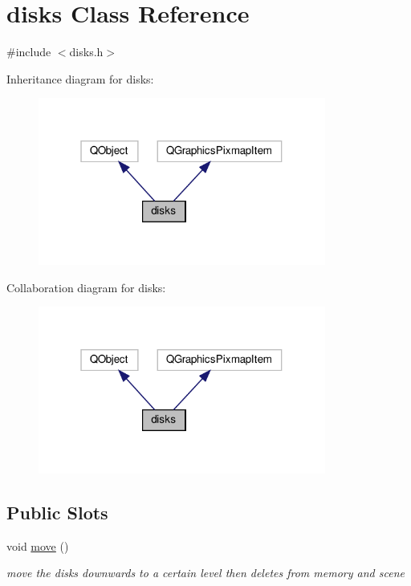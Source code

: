 \hypertarget{classdisks}{}\section{disks Class Reference}
\label{classdisks}


{\ttfamily \#include $<$disks.\+h$>$}



Inheritance diagram for disks\+:
\nopagebreak
\begin{figure}[H]
\begin{center}
\leavevmode
\includegraphics[width=268pt]{classdisks__inherit__graph}
\end{center}
\end{figure}


Collaboration diagram for disks\+:
\nopagebreak
\begin{figure}[H]
\begin{center}
\leavevmode
\includegraphics[width=268pt]{classdisks__coll__graph}
\end{center}
\end{figure}
\subsection*{Public Slots}
\begin{DoxyCompactItemize}
\item 
void \hyperlink{classdisks_ad9b431cedd6b82de1327bd241f23ab06}{move} ()
\begin{DoxyCompactList}\small\item\em move the disks downwards to a certain level then deletes from memory and scene \end{DoxyCompactList}\end{DoxyCompactItemize}
